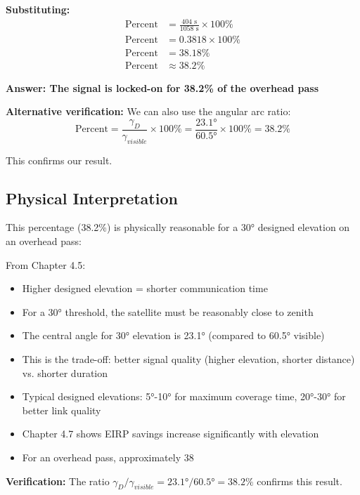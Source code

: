 \documentclass[11pt,letterpaper]{article}
\begin{document}
\textbf{Substituting:}
\begin{align}
\text{Percent} &= \frac{404 \text{ s}}{1058 \text{ s}} \times 100\% \\
\text{Percent} &= 0.3818 \times 100\% \\
\text{Percent} &= 38.18\% \\
\text{Percent} &\approx \boxed{38.2\%}
\end{align}

\vspace{0.3cm}

\textbf{Answer: The signal is locked-on for 38.2\% of the overhead pass}

\textbf{Alternative verification:} We can also use the angular arc ratio:
\begin{equation}
\text{Percent} = \frac{\gamma_D}{\gamma_{visible}} \times 100\% = \frac{23.1°}{60.5°} \times 100\% = 38.2\%
\end{equation}

This confirms our result.

\subsection{Physical Interpretation}
This percentage (38.2\%) is physically reasonable for a 30° designed elevation on an overhead pass:

From Chapter 4.5:
\begin{itemize}
    \item Higher designed elevation = shorter communication time
    \item For a 30° threshold, the satellite must be reasonably close to zenith
    \item The central angle for 30° elevation is 23.1° (compared to 60.5° visible)
    \item This is the trade-off: better signal quality (higher elevation, shorter distance) vs. shorter duration
    \item Typical designed elevations: 5°-10° for maximum coverage time, 20°-30° for better link quality
    \item Chapter 4.7 shows EIRP savings increase significantly with elevation
    \item For an overhead pass, approximately 38%
\end{itemize}

\textbf{Verification:} The ratio $\gamma_D / \gamma_{visible} = 23.1° / 60.5° = 38.2\%$ confirms this result.
\end{document}
